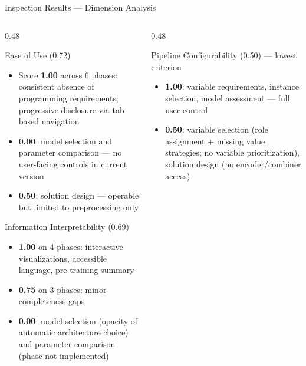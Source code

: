 \documentclass[aspectratio=169,10pt,english,dvipsnames]{beamer}
\begin{document}
\iffalse
\begin{frame}{Inspection Results --- Dimension Analysis} \small
  \begin{columns}[T]
    \begin{column}{0.48\textwidth}
      \begin{block}{Ease of Use (0.72)}
        \begin{itemize}\scriptsize
          \item Score \textbf{1.00} across 6 phases: consistent absence of
                programming requirements; progressive disclosure via
                tab-based navigation
          \item \textbf{0.00}: model selection and parameter comparison
                --- no user-facing controls in current version
          \item \textbf{0.50}: solution design --- operable but limited
                to preprocessing only
        \end{itemize}
      \end{block}
      \vspace{2mm}
      \begin{block}{Information Interpretability (0.69)}
        \begin{itemize}\scriptsize
          \item \textbf{1.00} on 4 phases: interactive visualizations,
                accessible language, pre-training summary
          \item \textbf{0.75} on 3 phases: minor completeness gaps
          \item \textbf{0.00}: model selection (opacity of automatic
                architecture choice) and parameter comparison
                (phase not implemented)
        \end{itemize}
      \end{block}
    \end{column}
    \begin{column}{0.48\textwidth}
      \begin{block}{Pipeline Configurability (0.50) --- lowest criterion}
        \begin{itemize}\scriptsize
          \item \textbf{1.00}: variable requirements, instance selection,
                model assessment --- full user control
          \item \textbf{0.50}: variable selection (role assignment + missing
                value strategies; no variable prioritization), solution design
                (no encoder/combiner access)

\end{itemize}
\end{block}
\end{column}
\end{columns}
\end{frame}
\end{document}
